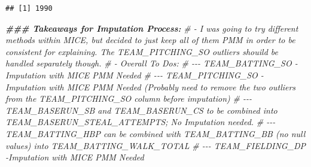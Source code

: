 \documentclass[
]{article}
\newenvironment{Shaded}{\begin{snugshade}}{\end{snugshade}}
\newcommand{\CommentTok}[1]{\textcolor[rgb]{0.56,0.35,0.01}{\textit{#1}}}
\newcommand{\DocumentationTok}[1]{\textcolor[rgb]{0.56,0.35,0.01}{\textbf{\textit{#1}}}}
\begin{document}
\begin{verbatim}
## [1] 1990
\end{verbatim}

\begin{Shaded}
\begin{Highlighting}[]
\DocumentationTok{\#\#\# Takeaways for Imputation Process:}
\CommentTok{\# {-} I was going to try different methods within MICE, but decided to just keep all of them PMM in order to be consistent for explaining. The TEAM\_PITCHING\_SO outliers shouild be handled separately though. }
\CommentTok{\# {-} Overall To Do\textquotesingle{}s: }
\CommentTok{\# {-}{-}{-} TEAM\_BATTING\_SO {-} Imputation with MICE PMM Needed}
\CommentTok{\# {-}{-}{-} TEAM\_PITCHING\_SO {-} Imputation with MICE PMM Needed (Probably need to remove the two outliers from the TEAM\_PITCHING\_SO column before imputation)}
\CommentTok{\# {-}{-}{-} TEAM\_BASERUN\_SB and TEAM\_BASERUN\_CS to be combined into TEAM\_BASERUN\_STEAL\_ATTEMPTS; No Imputation needed.}
\CommentTok{\# {-}{-}{-} TEAM\_BATTING\_HBP can be combined with TEAM\_BATTING\_BB (no null values) into TEAM\_BATTING\_WALK\_TOTAL}
\CommentTok{\# {-}{-}{-} TEAM\_FIELDING\_DP {-}Imputation with MICE PMM Needed}
\end{Highlighting}
\end{Shaded}
\end{document}
